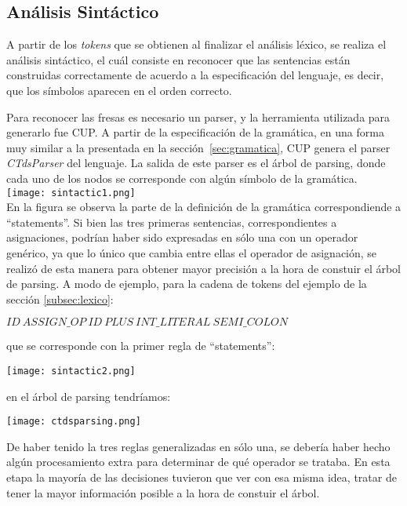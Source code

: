 \documentclass[11pt,a4paper]{article}
\begin{document}
\subsection{Análisis Sintáctico} 
\label{subsec:sintactico}
A partir de los \textit{tokens} que se obtienen al finalizar el análisis léxico, se realiza el análisis sintáctico, el cuál consiste en reconocer que las sentencias están construidas correctamente de acuerdo a la especificación del lenguaje, es decir, que los símbolos aparecen en el orden correcto. 

Para reconocer las fresas es necesario un parser, y la herramienta utilizada para generarlo fue CUP. A partir de la especificación de la gramática, en una forma muy similar a la presentada en la sección~\ref{sec:gramatica}, CUP genera el parser \textit{CTdsParser} del lenguaje. La salida de este parser es el árbol de parsing, donde cada uno de los nodos se corresponde con algún símbolo de la gramática.
\\

\texttt{[image: sintactic1.png]} \\ 

En la figura se observa la parte de la definición de la gramática correspondiende a ``statements''. Si bien las tres primeras sentencias, correspondientes a asignaciones, podrían haber sido expresadas en sólo una con un operador genérico, ya que lo único que cambia entre ellas el operador de asignación, se realizó de esta manera para obtener mayor precisión a la hora de constuir el árbol de parsing. A modo de ejemplo, para la cadena de tokens del ejemplo de la sección \ref{subsec:lexico}:
\begin{center}
	$ID \ ASSIGN\_OP \ ID \ PLUS \ INT\_LITERAL \ SEMI\_COLON$
\end{center}
que se corresponde con la primer regla de ``statements'':	
\begin{center}
\texttt{[image: sintactic2.png]} \\
\end{center}
en el árbol de parsing tendríamos:
\\
\begin{center}
\texttt{[image: ctdsparsing.png]} \\
\end{center}

De haber tenido la tres reglas generalizadas en sólo una, se debería haber hecho algún procesamiento extra para determinar de qué operador se trataba. En esta etapa la mayoría de las decisiones tuvieron que ver con esa misma idea, tratar de tener la mayor información posible a la hora de constuir el árbol.
\end{document}
